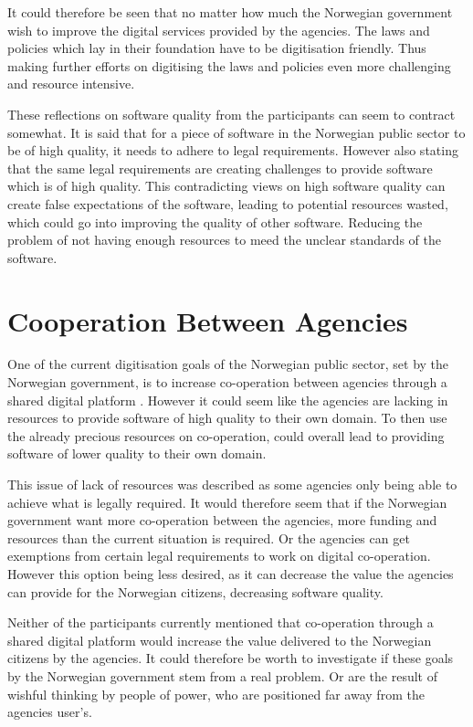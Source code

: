 It could therefore be seen that no matter how much the Norwegian government wish to improve the digital services provided by the agencies. The laws and policies which lay in their foundation have to be digitisation friendly. Thus making further efforts on digitising the laws and policies even more challenging and resource intensive.

These reflections on software quality from the participants can seem to contract somewhat. It is said that for a piece of software in the Norwegian public sector to be of high quality, it needs to adhere to legal requirements. However also stating that the same legal requirements are creating challenges to provide software which is of high quality. This contradicting views on high software quality can create false expectations of the software, leading to potential resources wasted, which could go into improving the quality of other software. Reducing the problem of not having enough resources to meed the unclear standards of the software.

\section{Cooperation Between Agencies}
One of the current digitisation goals of the Norwegian public sector, set by the Norwegian government, is to increase co-operation between agencies through a shared digital platform \cite{r_2019}. However it could seem like the agencies are lacking in resources to provide software of high quality to their own domain. To then use the already precious resources on co-operation, could overall lead to providing software of lower quality to their own domain. 

This issue of lack of resources was described as some agencies only being able to achieve what is legally required. It would therefore seem that if the Norwegian government want more co-operation between the agencies, more funding and resources than the current situation is required. Or the agencies can get exemptions from certain legal requirements to work on digital co-operation. However this option being less desired, as it can decrease the value the agencies can provide for the Norwegian citizens, decreasing software quality.

Neither of the participants currently mentioned that co-operation through a shared digital platform would increase the value delivered to the Norwegian citizens by the agencies. It could therefore be worth to investigate if these goals by the Norwegian government stem from a real problem. Or are the result of wishful thinking by people of power, who are positioned far away from the agencies user's. 

